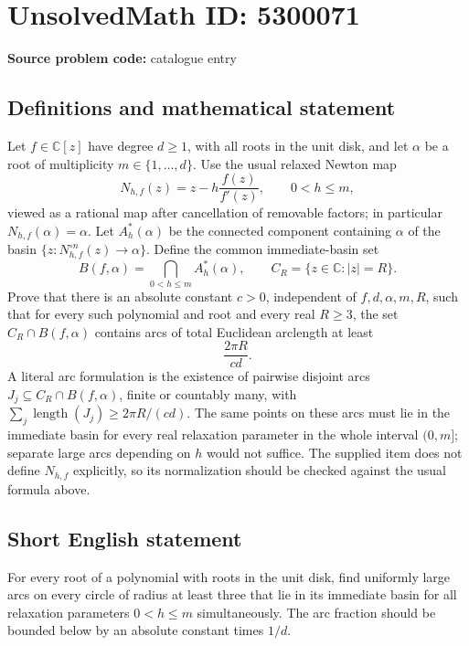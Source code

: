 \documentclass[11pt]{article}
\begin{document}
\section*{UnsolvedMath ID: 5300071}
\textbf{Source problem code:} catalogue entry
\subsection{Definitions and mathematical statement}
Let $f\in\mathbb C[z]$ have degree $d\geq1$, with all roots in the unit disk, and let $\alpha$ be a root of multiplicity $m\in\{1,\ldots,d\}$. Use the usual relaxed Newton map
\[
N_{h,f}(z)=z-h\frac{f(z)}{f'(z)},\qquad 0<h\leq m,
\]
viewed as a rational map after cancellation of removable factors; in particular $N_{h,f}(\alpha)=\alpha$. Let $A_h^*(\alpha)$ be the connected component containing $\alpha$ of the basin $\{z:N_{h,f}^{\circ n}(z)\to\alpha\}$. Define the common immediate-basin set
\[
B(f,\alpha)=\bigcap_{0<h\leq m}A_h^*(\alpha),\qquad C_R=\{z\in\mathbb C:|z|=R\}.
\]
Prove that there is an absolute constant $c>0$, independent of $f,d,\alpha,m,R$, such that for every such polynomial and root and every real $R\geq3$, the set $C_R\cap B(f,\alpha)$ contains arcs of total Euclidean arclength at least
\[
\frac{2\pi R}{cd}.
\]
A literal arc formulation is the existence of pairwise disjoint arcs $J_j\subseteq C_R\cap B(f,\alpha)$, finite or countably many, with $\sum_j\operatorname{length}(J_j)\geq2\pi R/(cd)$. The same points on these arcs must lie in the immediate basin for every real relaxation parameter in the whole interval $(0,m]$; separate large arcs depending on $h$ would not suffice. The supplied item does not define $N_{h,f}$ explicitly, so its normalization should be checked against the usual formula above.
\subsection{Short English statement}
For every root of a polynomial with roots in the unit disk, find uniformly large arcs on every circle of radius at least three that lie in its immediate basin for all relaxation parameters $0<h\leq m$ simultaneously. The arc fraction should be bounded below by an absolute constant times $1/d$.
\end{document}
